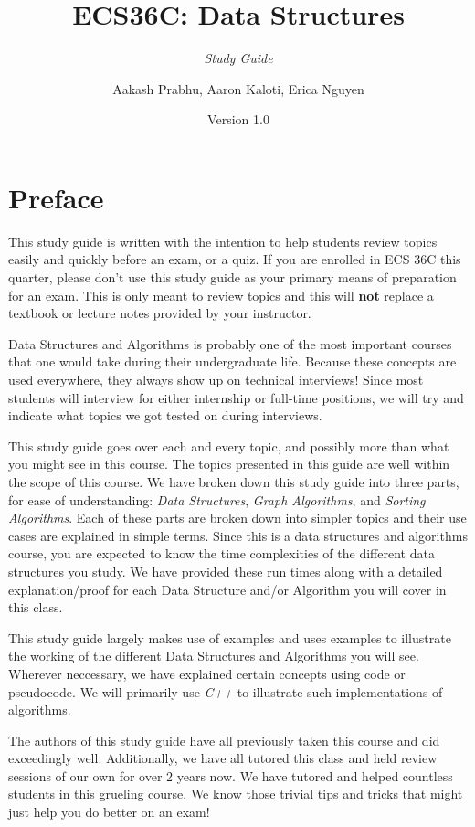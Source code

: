 \documentclass[]{book}
\title{ECS36C: Data Structures}
\subtitle{\emph{Study Guide}}
\author{Aakash Prabhu, Aaron Kaloti, Erica Nguyen}
\date{Version 1.0}
\begin{document}
\maketitle

{
\hypersetup{linkcolor=black}
\setcounter{tocdepth}{1}
\tableofcontents
}
\hypertarget{preface}{%
\chapter*{Preface}\label{preface}}

This study guide is written with the intention to help students review
topics easily and quickly before an exam, or a quiz. If you are enrolled
in ECS 36C this quarter, please don't use this study guide as your
primary means of preparation for an exam. This is only meant to review
topics and this will \textbf{not} replace a textbook or lecture notes
provided by your instructor.

Data Structures and Algorithms is probably one of the most important
courses that one would take during their undergraduate life. Because
these concepts are used everywhere, they always show up on technical
interviews! Since most students will interview for either internship or
full-time positions, we will try and indicate what topics we got tested
on during interviews.

This study guide goes over each and every topic, and possibly more than
what you might see in this course. The topics presented in this guide
are well within the scope of this course. We have broken down this study
guide into three parts, for ease of understanding: \emph{Data
Structures}, \emph{Graph Algorithms}, and \emph{Sorting Algorithms}.
Each of these parts are broken down into simpler topics and their use
cases are explained in simple terms. Since this is a data structures and
algorithms course, you are expected to know the time complexities of the
different data structures you study. We have provided these run times
along with a detailed explanation/proof for each Data Structure and/or
Algorithm you will cover in this class.

This study guide largely makes use of examples and uses examples to
illustrate the working of the different Data Structures and Algorithms
you will see. Wherever neccessary, we have explained certain concepts
using code or pseudocode. We will primarily use \emph{C++} to illustrate
such implementations of algorithms.

The authors of this study guide have all previously taken this course
and did exceedingly well. Additionally, we have all tutored this class
and held review sessions of our own for over 2 years now. We have
tutored and helped countless students in this grueling course. We know
those trivial tips and tricks that might just help you do better on an
exam!
\end{document}
